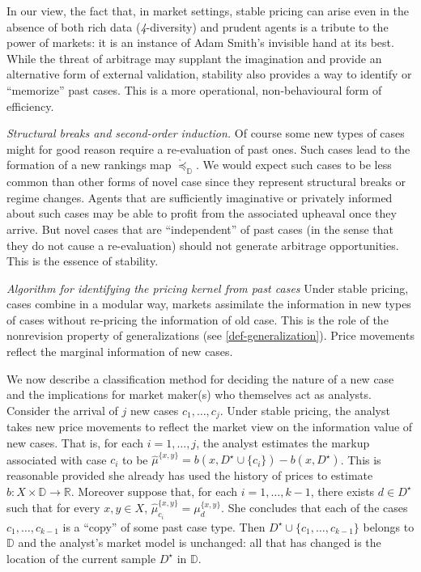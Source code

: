 \documentclass[ecta,nameyear,draft]{econsocart}
\newcommand{\R}{\mathbb R}
\newcommand{\mbbd}{{\mathds D}}
\newcommand{\past}{{D^\star}}
\newcommand{\fourdiv}{\textit{4}-\textup{diversity}}
\theoremstyle{plain}
\theoremstyle{remark}
\begin{document}
%

In our view, the fact that, in market settings, stable pricing can arise even
in the absence of both rich data (\fourdiv) and prudent agents is a tribute to
the power of markets: it is an instance of Adam Smith's invisible hand at its
best. While the threat of arbitrage may supplant the imagination and provide an
alternative form of external validation, stability also provides a way to
identify or ``memorize'' past cases. This is a more operational,
non-behavioural form of efficiency.

\emph{Structural breaks and second-order induction.} Of course some new
types of cases might for good reason require a re-evaluation of past ones. Such
cases lead to the formation of a new rankings map $\grave{\preceq}_{\mbbd}$. We
would expect such cases to be less common than other forms of novel case since
they represent structural breaks or regime changes.  Agents that are
sufficiently imaginative or privately informed about such cases may be able to
profit from the associated upheaval once they arrive. But novel cases that are
``independent'' of past cases (in the sense that they do not cause a
re-evaluation) should not generate arbitrage opportunities. This is the essence
of stability.

\emph{Algorithm for identifying the pricing kernel from past cases} Under
stable pricing, cases combine in a modular way, markets assimilate the
information in new types of cases without re-pricing the information of old
case. This is the role of the nonrevision property of {generalization}s (see
\cref{def-generalization}).  Price movements reflect the marginal information
of new cases. 

We now describe a classification method for deciding the nature of a new case
and the implications for market maker(s) who themselves act as analysts.
Consider the arrival of $j$ new cases ${c}_1, \dots, {c}_j$.  Under stable
pricing, the analyst takes new price movements to reflect the market view on
the information value of new cases.  That is, for each $i = 1,\dots, j$, the
analyst estimates the markup associated with case $c_i$ to be
$\hat{\mu}^{\{x,y\}} = b(x, \past \cup \{c_i\}) - b(x, \past) $.  This is
reasonable provided she already has used the history of prices to estimate
$b:X\times \mbbd \rightarrow \R$. Moreover suppose that, for each $i = 1,
\dots, k-1$, there exists $d\in \past$ such that for every $x,y \in X$,
$\hat{\mu}^{\{x,y\}}_{c_i} = \mu^{\{x,y\}}_{d}$.  She concludes that each of
the cases $c_1, \dots, c_{k-1}$ is a ``copy'' of some past case type. Then
$\past \cup \{c_1, \dots, c_{k-1}\}$ belongs to $\mbbd$ and the analyst's
market model is unchanged: all that has changed is the location of the current
sample $\past$ in $\mbbd$.
\end{document}
